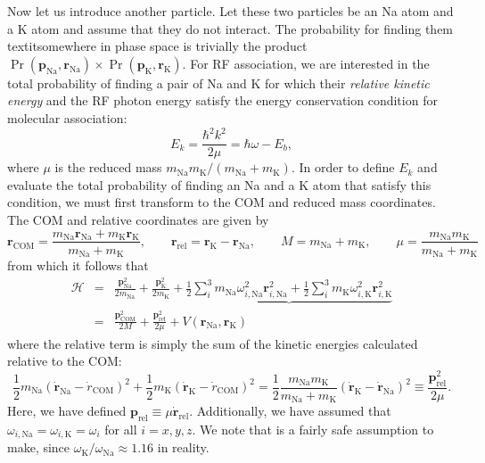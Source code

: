 \documentclass{article}
\theoremstyle{definition}
\newcommand{\ham}{\mathcal{H}}
\newcommand{\f}[2]{\frac{#1}{#2}}
\begin{document}
\noindent Now let us introduce another particle. Let these two particles be an Na atom and a K atom and assume that they do not interact. The probability for finding them textit{somewhere} in phase space is trivially the product $\Pr(\mathbf{p}_\text{Na}, \mathbf{r}_\text{Na}) \times \Pr(\mathbf{p}_\text{K}, \mathbf{r}_\text{K})$. For RF association, we are interested in the total probability of finding a pair of Na and K for which their \textit{relative kinetic energy} and the RF photon energy satisfy the energy conservation condition for molecular association:
\begin{equation}
E_k = \f{\hbar^2 k^2}{2\mu} = \hbar \omega - E_b,
\end{equation}
where $\mu$ is the reduced mass $m_\text{Na} m_\text{K} / (m_\text{Na} + m_\text{K})$. In order to define $E_k$ and evaluate the total probability of finding an Na and a K atom that satisfy this condition, we must first transform to the COM and reduced mass coordinates. The COM and relative coordinates are given by
\begin{equation}
\mathbf{r}_\text{COM} = \f{m_\text{Na} \mathbf{r}_\text{Na} + m_\text{K} \mathbf{r}_\text{K}}{ m_\text{Na} + m_\text{K}},
\quad\quad 
\mathbf{r}_\text{rel} = \mathbf{r}_\text{K}  - \mathbf{r}_\text{Na}, 
\quad\quad
M = m_\text{Na} + m_\text{K},
\quad\quad 
\mu = \f{m_\text{Na} m_\text{K} }{m_\text{Na} + m_\text{K}}
\end{equation}
from which it follows that
\begin{eqnarray}
\ham &=&  \f{\mathbf{p}_\text{Na}^2}{2m_\text{Na}} + \f{\mathbf{p}_\text{K}^2}{2m_\text{K}} + 
\underbrace{\f{1}{2} \sum_i^3 m_\text{Na}\omega_{i,\text{Na}}^2 \mathbf{r}_{i,\text{Na}}^2 + \f{1}{2} \sum_i^3 m_\text{K}\omega_{i,\text{K}}^2 \mathbf{r}_{i,\text{K}}^2} \\ 
&=& \f{\mathbf{p}_\text{COM}^2}{2M} + \f{\mathbf{p}^2_\text{rel}}{2\mu}  + V( \mathbf{r}_\text{Na}, \mathbf{r}_\text{K} )
\end{eqnarray}
where the relative term is simply the sum of the kinetic energies calculated relative to the COM:
\begin{equation}
\f{1}{2}m_\text{Na}(\dot{\mathbf{r}}_\text{Na} - \dot{r}_\text{COM})^2 + \f{1}{2}m_\text{K}(\dot{\mathbf{r}}_\text{K} - \dot{r}_\text{COM})^2 = \f{1}{2} \f{m_\text{Na}m_\text{K}}{m_\text{Na} + m_\text{K}} (\dot{\mathbf{r}}_\text{K}  - \dot{\mathbf{r}}_\text{Na} )^2 \equiv \f{\mathbf{p}_\text{rel}^2}{2\mu}.
\end{equation}
Here, we have defined $\mathbf{p}_\text{rel} \equiv \mu \dot{\mathbf{r}}_\text{rel}$. Additionally, we have assumed that $\omega_{i,\text{Na}} = \omega_{i,\text{K}} = \omega_i$ for all $i = x,y,z$. We note that is a fairly safe assumption to make, since $\omega_\text{K} / \omega_\text{Na} \approx 1.16$ in reality. \\
\end{document}
